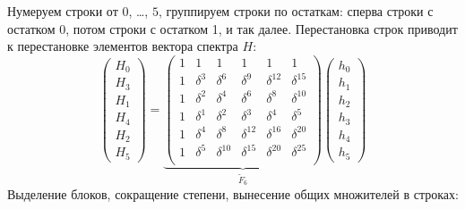 Нумеруем строки от $0$, \dots, $5$, группируем строки по остаткам: сперва строки с остатком 0, потом строки с остатком 1, и так далее. Перестановка строк приводит к перестановке
элементов вектора спектра $H$:
\[
    \begin{pmatrix}
        H_0 \\
        H_3 \\
        H_1 \\
        H_4 \\
        H_2 \\
        H_5
    \end{pmatrix}
    =
    \underbrace{
        \begin{pmatrix}
            1 & 1        & 1           & 1           & 1           & 1           \\
            1 & \delta^3 & \delta^6    & \delta^9    & \delta^{12} & \delta^{15} \\
            1 & \delta^2 & \delta^4    & \delta^6    & \delta^8    & \delta^{10} \\
            1 & \delta^1 & \delta^2    & \delta^3    & \delta^4    & \delta^5    \\
            1 & \delta^4 & \delta^8    & \delta^{12} & \delta^{16} & \delta^{20} \\
            1 & \delta^5 & \delta^{10} & \delta^{15} & \delta^{20} & \delta^{25} \\
        \end{pmatrix}
    }_{\widetilde{F}_6}
    \begin{pmatrix}
        h_0 \\
        h_1 \\
        h_2 \\
        h_3 \\
        h_4 \\
        h_5
    \end{pmatrix}
\]
Выделение блоков, сокращение степени, вынесение общих множителей в строках:
